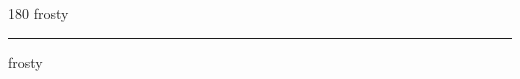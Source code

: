 
\begin{frame}
\begin{center}
\begin{turn}{180}
{\fontsize{2.5cm}{1em}\selectfont frosty}
\end{turn}
\vspace{1em}\par  
\hrule
\vspace{1em}\par  
{\fontsize{2.5cm}{1em}\selectfont frosty}
\end{center}
\end{frame}
